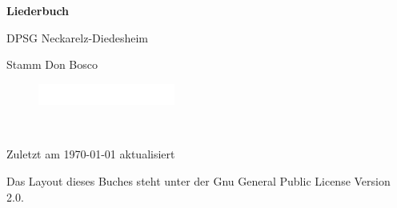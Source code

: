 \begin{titlepage}
\begin{center}
{\sffamily\huge\bfseries Liederbuch\par}
\vspace{1cm}
{\sffamily\Large DPSG Neckarelz-Diedesheim\par}
\vspace{0.5cm}
{\sffamily\Large Stamm Don Bosco\par}
\vspace{0.5cm}
\begin{figure}[h]
\centering
\includegraphics[width=0.4\textwidth]{img/logo.jpg}\par\
\end{figure}
{\sffamily\small Zuletzt am \today{} aktualisiert\par}
\vspace{0.5cm}
{\sffamily\tiny Das Layout dieses Buches steht unter der Gnu General Public License Version 2.0.\par}
\end{center}
\end{titlepage}
